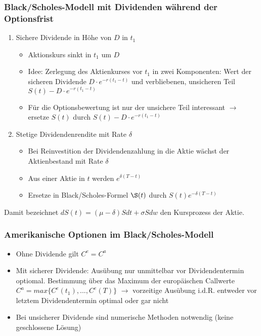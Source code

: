 \subsubsection{Black/Scholes-Modell mit Dividenden während der Optionsfrist}
\begin{enumerate}
	\item Sichere Dividende in Höhe von \(D\) in \(t_1\)
	\begin{itemize}
		\item Aktionskurs sinkt in \(t_1\) um \(D\)
		\item Idee: Zerlegung des Aktienkurses vor \(t_1\) in zwei Komponenten: Wert der sicheren Dividende \(D\cdot e^{-r(t_1-t)}\) und verbliebenen, unsicheren Teil \(S(t)-D\cdot e^{-r(t_1-t)}\)
		\item Für die Optionsbewertung ist nur der unsichere Teil interessant \(\rightarrow\) ersetze \(S(t)\) durch \(S(t)-D\cdot e^{-r(t_1-t)}\)
	\end{itemize}
	\item Stetige Dividendenrendite mit Rate \(\delta\)
	\begin{itemize}
		\item Bei Reinvestition der Dividendenzahlung in die Aktie wächst der Aktienbestand mit Rate \(\delta\)
		\item Aus einer Aktie in \(t\) werden \(e^{\delta(T-t)}\)
		\item Ersetze in Black/Scholes-Formel \(\S(t)\) durch \(S(t)e^{-\delta(T-t)}\)
	\end{itemize}
\end{enumerate}
Damit bezeichnet \(dS(t) = (\mu - \delta)Sdt + \sigma Sdw\) den Kursprozess der Aktie.

\subsubsection{Amerikanische Optionen im Black/Scholes-Modell}
\begin{itemize}
	\item Ohne Dividende gilt \(C^e = C^a\)
	\item Mit sicherer Dividende: Ausübung nur unmittelbar vor Dividendentermin optiomal. Bestimmung über das Maximum der europäischen Callwerte \(C^a = max\{C^e(t_1),...,C^e(T)\}\) \(\rightarrow\) vorzeitige Ausübung i.d.R. entweder vor letztem Dividendentermin optimal oder gar nicht
	\item Bei unsicherer Dividende sind numerische Methoden notwendig (keine geschlossene Lösung)
\end{itemize}

